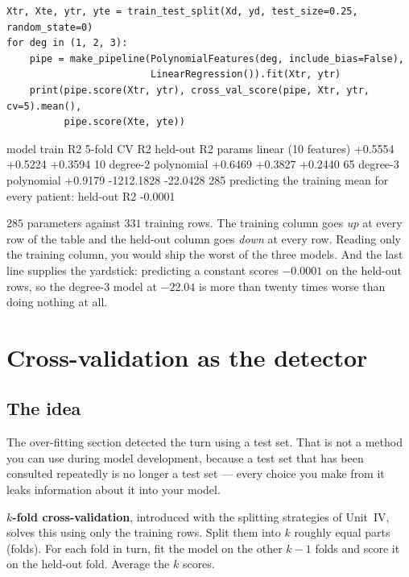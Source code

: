 \documentclass[11pt]{article}
\begin{document}
\begin{lstlisting}
Xtr, Xte, ytr, yte = train_test_split(Xd, yd, test_size=0.25, random_state=0)
for deg in (1, 2, 3):
    pipe = make_pipeline(PolynomialFeatures(deg, include_bias=False),
                         LinearRegression()).fit(Xtr, ytr)
    print(pipe.score(Xtr, ytr), cross_val_score(pipe, Xtr, ytr, cv=5).mean(),
          pipe.score(Xte, yte))
\end{lstlisting}
\begin{codeout}
model                          train R2    5-fold CV R2   held-out R2   params
linear (10 features)         +0.5554        +0.5224        +0.3594          10
degree-2 polynomial          +0.6469        +0.3827        +0.2440          65
degree-3 polynomial          +0.9179     -1212.1828       -22.0428         285
predicting the training mean for every patient: held-out R2 -0.0001
\end{codeout}

$285$ parameters against $331$ training rows. The training column goes
\emph{up} at every row of the table and the held-out column goes \emph{down} at
every row. Reading only the training column, you would ship the worst of the
three models. And the last line supplies the yardstick: predicting a constant
scores $-0.0001$ on the held-out rows, so the degree-3 model at $-22.04$ is
more than twenty times worse than doing nothing at all.

\section{Cross-validation as the detector}
\label{sec:cv}

\subsection{The idea}

The over-fitting section detected the turn using a test set. That is not a
method you can use during model development, because a test set that has been
consulted repeatedly is no longer a test set --- every choice you make from it
leaks information about it into your model.

\textbf{$k$-fold cross-validation}, introduced with the splitting strategies of
Unit~IV, solves this using only the training rows. Split them into $k$ roughly
equal parts (folds). For each fold in turn, fit
the model on the other $k-1$ folds and score it on the held-out fold. Average
the $k$ scores.
\end{document}
